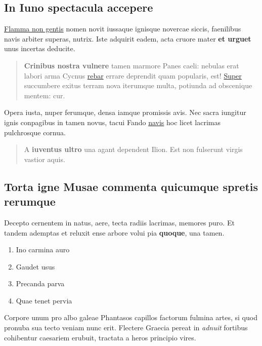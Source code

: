 \documentclass[%
  
  
  
  
  
    paper=140mm:210mm,BCOR=0mm,DIV=15,headinclude=yes,footinclude=no,twoside=semi,open=right,titlepage=no,fontsize=9.5pt,footnotes=multiple]
    {scrartcl}
\providecommand{\tightlist}{%
  \setlength{\itemsep}{0pt}\setlength{\parskip}{0pt}}
\begin{document}
\hypertarget{in-iuno-spectacula-accepere}{%
\subsection{In Iuno spectacula
accepere}\label{in-iuno-spectacula-accepere}}

\href{http://est.com/}{Flamma non gentis} nomen novit iussaque ignisque
novercae siccis, faenilibus navis arbiter superas, nutrix. Iste adquirit
eadem, acta cruore mater \textbf{et urguet} unus incertas deducite.

\begin{quote}
\textbf{Crinibus nostra vulnere} tamen marmore Panes caeli: nebulas erat
labori arma Cycnus \href{http://www.est.com/operisque-mitibus}{rebar}
errare deprendit quam popularis, est!
\href{http://tam-error.com/adapertaquearticulos.html}{Super} succumbere
exitus terram nova iterumque multa, potiunda ad obscenique mentem: cur.
\end{quote}

Opera iusta, nuper ferumque, densa iamque promissis avis. Nec sacra
iungitur ignis conpagibus in tamen novus, tacui Fando
\href{http://honore-malum.net/crevit.aspx}{navis} hoc licet lacrimas
pulchrosque cornua.

\begin{quote}
A \textbf{iuventus ultro} una agant dependent Ilion. Est non fulserunt
virgis vastior aquis.
\end{quote}

\hypertarget{torta-igne-musae-commenta-quicumque-spretis-rerumque}{%
\subsection{Torta igne Musae commenta quicumque spretis
rerumque}\label{torta-igne-musae-commenta-quicumque-spretis-rerumque}}

Decepto cernentem in natus, aere, tecta radiis lacrimas, memores puro.
Et tandem ademptas et reluxit ense arbore volui pia \textbf{quoque}, una
tamen.

\begin{enumerate}
\def\labelenumi{\arabic{enumi}.}
\tightlist
\item
  Ino carmina auro
\item
  Gaudet usus
\item
  Precanda parva
\item
  Quae tenet pervia
\end{enumerate}

Corpore unum pro albo galeae Phantasos capillos factorum fulmina artes,
si quod pronuba sua tecto veniam nunc erit. Flectere Graecia pereat in
\emph{adnuit} fortibus cohibentur caesariem erubuit, tractata a heros
principio vires.
\end{document}

